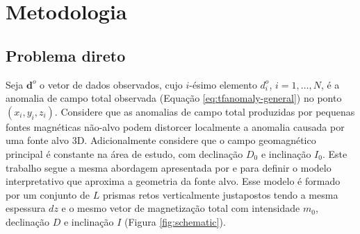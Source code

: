 \chapter{Metodologia}

\section{Problema direto}

Seja $\mathbf{d}^{o}$ o vetor de dados observados, cujo $i$-ésimo elemento $d^{o}_{i}$, $i = 1, \dots, N$, é a anomalia de campo total observada (Equação \ref{eq:tfanomaly-general}) no ponto $(x_{i}, y_{i}, z_{i})$.
Considere que as anomalias de campo total produzidas por pequenas fontes magnéticas não-alvo podem distorcer localmente a anomalia causada por uma fonte alvo 3D.
Adicionalmente considere que o campo geomagnético principal é constante na área de estudo, com declinação $ D_ {0} $ e inclinação $ I_ {0} $.
Este trabalho segue a mesma abordagem apresentada por \cite{oliveirajr_etal2011} e \cite{oliveirajr_barbosa2013} para definir o modelo interpretativo que aproxima a geometria da fonte alvo.
Esse modelo é formado por um conjunto de $L$ prismas retos verticalmente justapostos tendo a mesma espessura $dz$ e o mesmo vetor de magnetização total com intensidade $m_{0}$, declinação $D$ e inclinação $I$ (Figura \ref{fig:schematic}).

